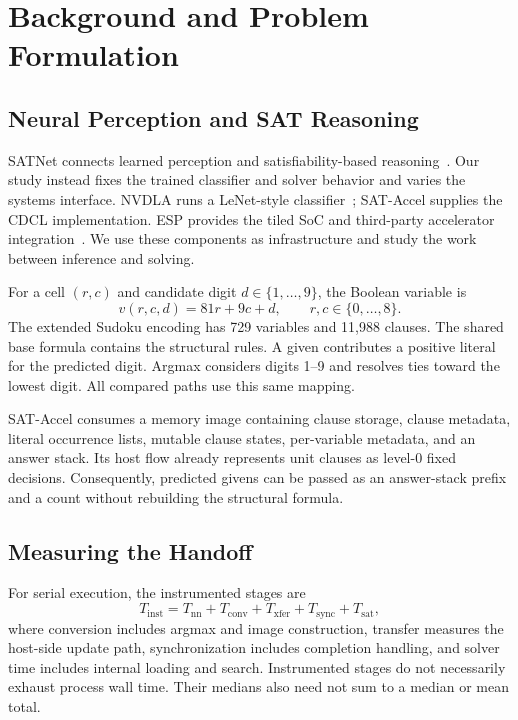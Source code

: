 \section{Background and Problem Formulation}
\subsection{Neural Perception and SAT Reasoning}
SATNet connects learned perception and satisfiability-based reasoning~\cite{satnet}. Our study instead fixes the trained classifier and solver behavior and varies the systems interface. NVDLA runs a LeNet-style classifier~\cite{lenet,nvdla}; SAT-Accel supplies the CDCL implementation. ESP provides the tiled SoC and third-party accelerator integration~\cite{esp,espnvdla}. We use these components as infrastructure and study the work between inference and solving.

For a cell $(r,c)$ and candidate digit $d\in\{1,\ldots,9\}$, the Boolean variable is
\begin{equation}
v(r,c,d)=81r+9c+d,\qquad r,c\in\{0,\ldots,8\}.
\end{equation}
The extended Sudoku encoding has 729 variables and 11,988 clauses. The shared base formula contains the structural rules. A given contributes a positive literal for the predicted digit. Argmax considers digits 1--9 and resolves ties toward the lowest digit. All compared paths use this same mapping.

SAT-Accel consumes a memory image containing clause storage, clause metadata, literal occurrence lists, mutable clause states, per-variable metadata, and an answer stack. Its host flow already represents unit clauses as level-0 fixed decisions. Consequently, predicted givens can be passed as an answer-stack prefix and a count without rebuilding the structural formula.

\subsection{Measuring the Handoff}
For serial execution, the instrumented stages are
\begin{equation}
T_{\mathrm{inst}}=T_{\mathrm{nn}}+T_{\mathrm{conv}}+T_{\mathrm{xfer}}
                  +T_{\mathrm{sync}}+T_{\mathrm{sat}},
\end{equation}
where conversion includes argmax and image construction, transfer measures the host-side update path, synchronization includes completion handling, and solver time includes internal loading and search. Instrumented stages do not necessarily exhaust process wall time. Their medians also need not sum to a median or mean total.

